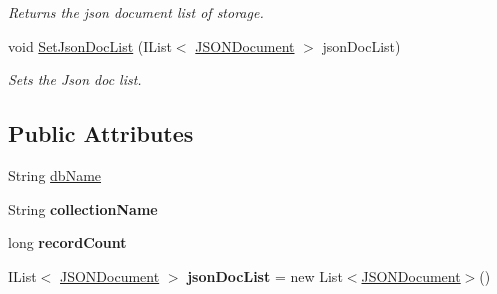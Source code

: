 \begin{DoxyCompactItemize}
\begin{DoxyCompactList}\small\item\em Returns the json document list of storage. \end{DoxyCompactList}\item 
void \hyperlink{classcom_1_1shephertz_1_1app42_1_1paas_1_1sdk_1_1csharp_1_1storage_1_1_storage_a3af7d8e17208468eccd38d0bb3a32622}{Set\+Json\+Doc\+List} (I\+List$<$ \hyperlink{classcom_1_1shephertz_1_1app42_1_1paas_1_1sdk_1_1csharp_1_1storage_1_1_storage_1_1_j_s_o_n_document}{J\+S\+O\+N\+Document} $>$ json\+Doc\+List)
\begin{DoxyCompactList}\small\item\em Sets the Json doc list. \end{DoxyCompactList}\end{DoxyCompactItemize}
\subsection*{Public Attributes}
\begin{DoxyCompactItemize}
\item 
String \hyperlink{classcom_1_1shephertz_1_1app42_1_1paas_1_1sdk_1_1csharp_1_1storage_1_1_storage_a55a3b941e53c1a16eac1735e174edd49}{db\+Name}
\item 
\hypertarget{classcom_1_1shephertz_1_1app42_1_1paas_1_1sdk_1_1csharp_1_1storage_1_1_storage_a553e21d6b414a9cacf52321483b8c89a}{String {\bfseries collection\+Name}}\label{classcom_1_1shephertz_1_1app42_1_1paas_1_1sdk_1_1csharp_1_1storage_1_1_storage_a553e21d6b414a9cacf52321483b8c89a}

\item 
\hypertarget{classcom_1_1shephertz_1_1app42_1_1paas_1_1sdk_1_1csharp_1_1storage_1_1_storage_a6830007a7adefe8c18ecc8c8318aa463}{long {\bfseries record\+Count}}\label{classcom_1_1shephertz_1_1app42_1_1paas_1_1sdk_1_1csharp_1_1storage_1_1_storage_a6830007a7adefe8c18ecc8c8318aa463}

\item 
\hypertarget{classcom_1_1shephertz_1_1app42_1_1paas_1_1sdk_1_1csharp_1_1storage_1_1_storage_a334b92a01d942f2c1a940cc63eb0caeb}{I\+List$<$ \hyperlink{classcom_1_1shephertz_1_1app42_1_1paas_1_1sdk_1_1csharp_1_1storage_1_1_storage_1_1_j_s_o_n_document}{J\+S\+O\+N\+Document} $>$ {\bfseries json\+Doc\+List} = new List$<$\hyperlink{classcom_1_1shephertz_1_1app42_1_1paas_1_1sdk_1_1csharp_1_1storage_1_1_storage_1_1_j_s_o_n_document}{J\+S\+O\+N\+Document}$>$()}\label{classcom_1_1shephertz_1_1app42_1_1paas_1_1sdk_1_1csharp_1_1storage_1_1_storage_a334b92a01d942f2c1a940cc63eb0caeb}

\end{DoxyCompactItemize}


